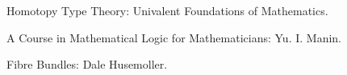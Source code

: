 \documentclass[10pt]{beamer}
\begin{document}

\begin{frame}

\begin{thebibliography}{99}

Homotopy Type Theory: Univalent Foundations of Mathematics.

A Course in Mathematical Logic for Mathematicians: Yu. I. Manin. 

Fibre Bundles: Dale Husemoller.


\end{thebibliography}
\end{frame}
\end{document}
